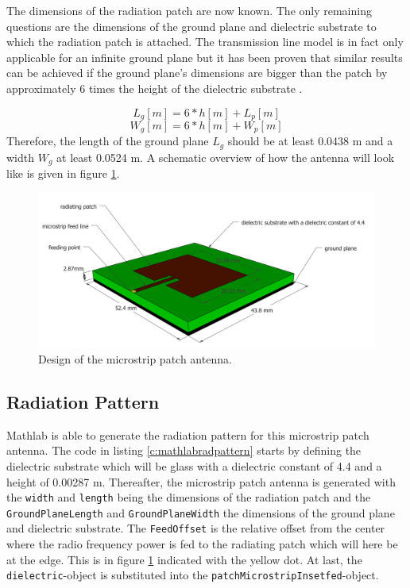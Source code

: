 The dimensions of the radiation patch are now known. The only remaining questions are the dimensions of the ground plane and dielectric substrate to which the 
radiation patch is attached. The transmission line model is in fact only applicable for an infinite ground plane but it has been proven that similar results
can be achieved if the ground plane's dimensions are bigger than the patch by approximately 6 times the height of the dielectric substrate \cite{J14_antennadesign,J15_antennadesign}.

\begin{equation} 
L_{g} [m] = 6 * h [m] + L_p [m]
\end{equation}
\begin{equation} 
W_{g} [m] = 6 * h [m] + W_p [m]
\end{equation}
Therefore, the length of the ground plane $L_{g}$ should be at least 0.0438 m and a width $W_{g}$ at least 0.0524 m.
A schematic overview of how the antenna will look like is given in figure \ref{fig:antennadesign}.
\begin{figure}[h!]
\centering
  \includegraphics[width=\textwidth]{../images/MicrostripAntenna.png}
  \caption{Design of the microstrip patch antenna.}
  \label{fig:antennadesign}
\end{figure}

\subsection{Radiation Pattern}
Mathlab is able to generate the radiation pattern for this microstrip patch antenna.
The code in  listing \ref{c:mathlabradpattern} starts by defining the dielectric substrate which will be glass with a dielectric constant
of 4.4 and a height of 0.00287 m. Thereafter, the microstrip patch antenna is generated with the \verb|width| and \verb|length| being the dimensions
of the radiation patch and the \verb|GroundPlaneLength| and \verb|GroundPlaneWidth| the dimensions of the ground plane and dielectric substrate.
The \verb|FeedOffset| is the relative offset from the center where the radio frequency power is fed to the radiating patch which will here be
at the edge. This is in figure \ref{fig:antennadesign} indicated with the yellow dot. At last, the \verb|dielectric|-object is substituted into the 
\verb|patchMicrostripInsetfed|-object.

